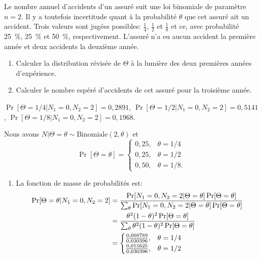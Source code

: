 \begin{exercice}
  Le nombre annuel d'accidents d'un assuré suit une loi binomiale de
  paramètre $n = 2$. Il y a toutefois incertitude quant à la
  probabilité $\theta$ que cet assuré ait un accident. Trois valeurs
  sont jugées possibles: $\frac{1}{4}$, $\frac{1}{2}$ et $\frac{1}{8}$
  et ce, avec probabilité 25~\%, 25~\% et 50~\%, respectivement.
  L'assuré n'a eu aucun accident la première année et deux accidents
  la deuxième année.
  \begin{enumerate}
  \item Calculer la distribution révisée de $\Theta$ à la lumière des
    deux premières années d'expérience.
  \item Calculer le nombre espéré d'accidents de cet assuré pour la
    troisième année.
  \end{enumerate}
  \begin{rep}
    $\Pr[\Theta = 1/4|N_1 = 0, N_2 = 2] = 0,2891$,
    $\Pr[\Theta = 1/2|N_1 = 0, N_2 = 2] = 0,5141$,
    $\Pr[\Theta = 1/8|N_1 = 0, N_2 = 2] = 0,1968$.
  \end{rep}
  \begin{sol}
    Nous avons $N|\Theta = \theta \sim \text{Binomiale}(2, \theta)$ et
    \begin{equation*}
      \Pr[\Theta = \theta] =
      \begin{cases}
        0,25, & \theta = 1/4 \\
        0,25, & \theta = 1/2 \\
        0,50, & \theta = 1/8.
      \end{cases}
    \end{equation*}
    \begin{enumerate}
    \item La fonction de masse de probabilités est:
      \begin{align*}
        \Pr[\Theta = \theta|N_1 = 0, N_2 = 2]
        &= \frac{\Pr[N_1 = 0, N_2 = 2|\Theta = \theta]
          \Pr[\Theta = \theta]}{%
          \sum_{\theta} \Pr[N_1 = 0, N_2 = 2|\Theta = \theta]
          \Pr[\Theta = \theta]} \\
        &= \frac{\theta^2 (1 - \theta)^2 \Pr[\Theta = \theta]}{%
          \sum_{\theta} \theta^2 (1 - \theta)^2 \Pr[\Theta = \theta]} \\
        &=
        \begin{cases}
          \frac{0,008789}{0,030396}, & \theta = 1/4 \\
          \frac{0,015625}{0,030396}, & \theta = 1/2 \\

\end{cases}
\end{align*}
\end{enumerate}
\end{sol}
\end{exercice}

